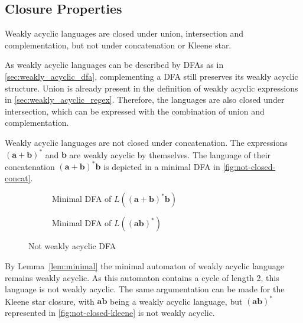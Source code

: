 \subsection{Closure Properties}
Weakly acyclic languages are closed under union, intersection and complementation, but not under concatenation or Kleene star. 
\par 
As weakly acyclic languages can be described by DFAs as in \autoref{sec:weakly_acyclic_dfa}, complementing a DFA still preserves its weakly acyclic structure. Union is already present in the definition of weakly acyclic expressions in \autoref{sec:weakly_acyclic_regex}. Therefore, the languages are also closed under intersection, which can be expressed with the combination of union and complementation. 
\par
Weakly acyclic languages are not closed under concatenation. The expressions $\bm{(a + b)^{*}}$ and $\bm{b}$ are weakly acyclic by themselves. The language of their concatenation $\bm{(a + b)^{*}b}$ is depicted in a minimal DFA in \autoref{fig:not-closed-concat}.

\begin{figure}[t]
\centering 
	\begin{subfigure}{.30\textwidth}	
		\centering 
    	 \caption{Minimal DFA of $L(\bm{(a + b)^{*}b})$}\label{fig:not-closed-concat}
    \end{subfigure}
    \begin{subfigure}{.60\textwidth}
	\centering 
    	\caption{Minimal DFA of $L(\bm{(ab)^{*}})$}\label{fig:not-closed-kleene}
    \end{subfigure}
     \caption{Not weakly acyclic DFA}
\end{figure}

By Lemma~\autoref{lem:minimal} the minimal automaton of weakly acyclic language remains weakly acyclic. As this automaton contains a cycle of length 2, this language is not weakly acyclic. The same argumentation can be made for the Kleene star closure, with $\bm{ab}$ being a weakly acyclic language, but $\bm{(ab)^{*}}$ represented in \autoref{fig:not-closed-kleene} is not weakly acyclic. 

